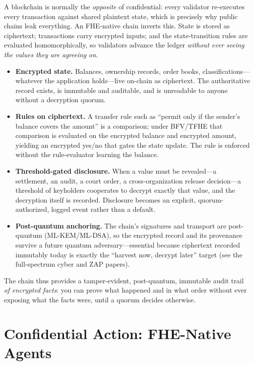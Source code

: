 \documentclass[11pt,letterpaper]{article}
\begin{document}
A blockchain is normally the \emph{opposite} of confidential: every validator
re-executes every transaction against shared plaintext state, which is precisely
why public chains leak everything. An FHE-native chain inverts this. State is
stored as ciphertext; transactions carry encrypted inputs; and the state-transition
rules are evaluated homomorphically, so validators advance the ledger
\emph{without ever seeing the values they are agreeing on}.

\begin{itemize}
  \item \textbf{Encrypted state.} Balances, ownership records, order books,
  classifications---whatever the application holds---live on-chain as ciphertext.
  The authoritative record exists, is immutable and auditable, and is unreadable to
  anyone without a decryption quorum.
  \item \textbf{Rules on ciphertext.} A transfer rule such as ``permit only if the
  sender's balance covers the amount'' is a comparison; under BFV/TFHE that
  comparison is evaluated on the encrypted balance and encrypted amount, yielding an
  encrypted yes/no that gates the state update. The rule is enforced without the
  rule-evaluator learning the balance.
  \item \textbf{Threshold-gated disclosure.} When a value must be revealed---a
  settlement, an audit, a court order, a cross-organization release decision---a
  threshold of
  keyholders cooperates to decrypt exactly that value, and the decryption itself is
  recorded. Disclosure becomes an explicit, quorum-authorized, logged event rather
  than a default.
  \item \textbf{Post-quantum anchoring.} The chain's signatures and transport are
  post-quantum (ML-KEM/ML-DSA), so the encrypted record and its provenance survive a
  future quantum adversary---essential because ciphertext recorded immutably today
  is exactly the ``harvest now, decrypt later'' target (see the full-spectrum cyber
  and ZAP papers).
\end{itemize}

The chain thus provides a tamper-evident, post-quantum, immutable audit trail
\emph{of encrypted facts}: you can prove what happened and in what order without
ever exposing what the facts were, until a quorum decides otherwise.

\section{Confidential Action: FHE-Native Agents}
\end{document}
